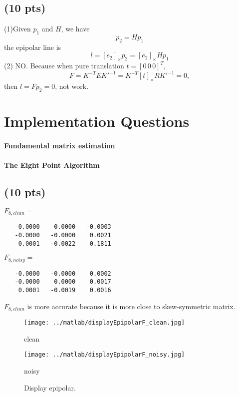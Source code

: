 \documentclass[12pt]{article}
\newcounter{list}
\begin{document}
\subsection{(10 pts)}
(1)Given $p_1$ and $H$, we have
$$p_2 = Hp_1$$
the epipolar line is
$$l = [e_2]_{\times}p_2 = [e_2]_{\times}Hp_1$$
(2)
NO. Because when pure translation $t=[ 0\, 0\, 0 ]^T$,
$$F=K^{-T}EK'^{-1}=K^{-T}[t]_{\times}RK'^{-1} = 0,$$
then $l=Fp_2=0$, not work.
\section{Implementation Questions}

\paragraph{\Large{Fundamental matrix estimation}}

\paragraph{The Eight Point Algorithm\\}

\subsection{(10 pts)}
$F_{8,clean}=$
\begin{verbatim}
   -0.0000    0.0000   -0.0003
   -0.0000   -0.0000    0.0021
    0.0001   -0.0022    0.1811
\end{verbatim}
$F_{8,noisy}=$
\begin{verbatim}
   -0.0000   -0.0000    0.0002
   -0.0000    0.0000    0.0017
    0.0001   -0.0019    0.0016
\end{verbatim}
$F_{8,clean}$ is more accurate because it is more close to skew-symmetric matrix.

\begin{figure}[htbp]
\begin{minipage}{\linewidth}
\centering \texttt{[image: ../matlab/displayEpipolarF\_clean.jpg]}
\caption*{clean}
\end{minipage}
\begin{minipage}{\linewidth}
\centering \texttt{[image: ../matlab/displayEpipolarF\_noisy.jpg]}
\caption*{noisy}
\end{minipage}
\caption{Display epipolar.}
\end{figure}


\end{document}
